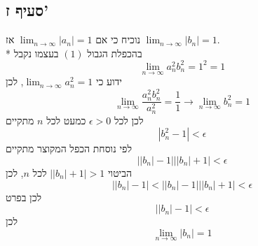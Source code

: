 \documentclass[a4paper]{article}
\begin{document}
\subsection{סעיף ז'}
נוכיח כי אם $\lim_{n \to \infty} |a_n| = 1$
אז $\lim_{n \to \infty} |b_n| = 1$. \\*
בהכפלת הגבול $(1)$ בעצמו נקבל
\[
	\lim_{n \to \infty} a_n^2 b_n^2 = 1^2 = 1
\]
ידוע כי $\lim_{n \to \infty} a_n^2 = 1$, לכן
\[
	\lim_{n \to \infty} \frac{a_n^2 b_n^2}{a_n^2} = \frac{1}{1}
	\rightarrow
	\lim_{n \to \infty} b_n^2 = 1
\]
לכן לכל $\epsilon > 0$ כמעט לכל $n$ מתקיים
\[
	|b_n^2 - 1| < \epsilon
\]
לפי נוסחת הכפל המקוצר מתקיים
\[
	\left| \left| b_n \right| - 1 \right|
	\left| \left| b_n \right| + 1 \right| < \epsilon
\]
הביטוי $\left| \left| b_n \right| + 1 \right| > 1$ לכל $n$, לכן
\[
	\left| \left| b_n \right| - 1 \right| <
	\left| \left| b_n \right| - 1 \right|
	\left| \left| b_n \right| + 1 \right| < \epsilon
\]
לכן בפרט
\[
	\left| \left| b_n \right| - 1 \right| < \epsilon
\]
לכן
\[
	\lim_{n \to \infty} |b_n| = 1
\]
\end{document}

